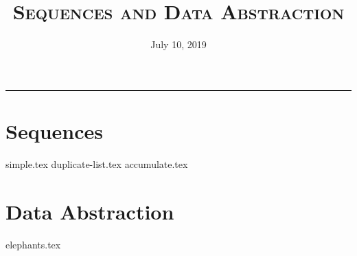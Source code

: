 \documentclass{exam}
\title{\textsc{Sequences and Data Abstraction}}
\date{July 10, 2019}
\begin{document}
\maketitle
\rule{\textwidth}{0.15em}
\fontsize{12}{15}\selectfont


\section{Sequences}
\begin{questions}
{simple.tex}
{duplicate-list.tex}
\newpage
{accumulate.tex}
\end{questions}


\newpage
\section{Data Abstraction}
\begin{questions}
{elephants.tex}
\end{questions}
\end{document}
